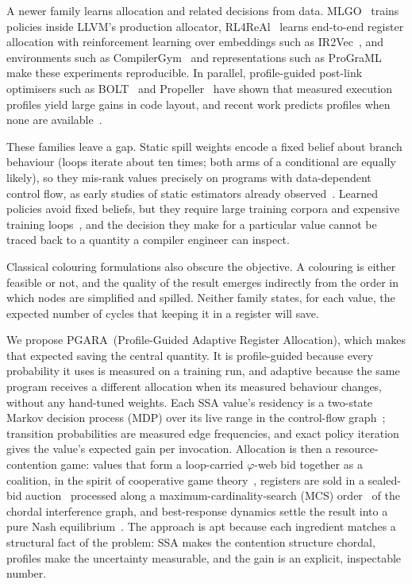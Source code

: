 \documentclass[conference]{IEEEtran}
\newcommand{\MG}{PGARA}
\begin{document}
A newer family learns allocation and related decisions from data.
MLGO~\cite{trofin2021mlgo} trains policies inside LLVM's production
allocator, RL4ReAl~\cite{venkatakeerthy2023rl4real} learns end-to-end
register allocation with reinforcement learning over embeddings such as
IR2Vec~\cite{venkatakeerthy2020ir2vec}, and environments such as
CompilerGym~\cite{cummins2022compilergym} and representations such as
ProGraML~\cite{cummins2021programl} make these experiments
reproducible. In parallel, profile-guided post-link optimisers such as
BOLT~\cite{panchenko2019bolt} and Propeller~\cite{shen2023propeller}
have shown that measured execution profiles yield large gains in code
layout, and recent work predicts profiles when none are
available~\cite{rotem2021pgo}.

These families leave a gap. Static spill weights encode a fixed belief
about branch behaviour (loops iterate about ten times; both arms of a
conditional are equally likely), so they mis-rank values precisely on
programs with data-dependent control flow, as early studies of static
estimators already observed~\cite{wagner1994,wu1994}. Learned policies
avoid fixed beliefs, but they require large training corpora and
expensive training loops~\cite{sutton2018rl}, and the decision they make
for a particular value cannot be traced back to a quantity a compiler
engineer can inspect.

Classical colouring formulations also obscure the objective. A
colouring is either feasible or not, and the quality of the result
emerges indirectly from the order in which nodes are simplified and
spilled. Neither family states, for each value, the expected number of
cycles that keeping it in a register will save.

We propose \MG\ (Profile-Guided Adaptive Register Allocation), which
makes that expected saving the central quantity. It is profile-guided
because every probability it uses is measured on a training run, and
adaptive because the same program receives a different allocation when
its measured behaviour changes, without any hand-tuned weights.
Each SSA value's residency is a two-state Markov decision process (MDP)
over its live range in the control-flow graph~\cite{puterman1994,bertsekas2019};
transition probabilities are measured edge frequencies, and exact policy
iteration~\cite{howard1960} gives the value's expected gain per
invocation. Allocation is then a resource-contention game: values that
form a loop-carried $\varphi$-web bid together as a coalition, in the
spirit of cooperative game theory~\cite{shapley1953}, registers are sold
in a sealed-bid auction~\cite{vickrey1961} processed along a
maximum-cardinality-search (MCS) order~\cite{tarjan1984} of the chordal
interference graph, and best-response dynamics settle the result into a
pure Nash equilibrium~\cite{rosenthal1973,nisan2007agt}. The approach
is apt because each ingredient matches a structural fact of the problem:
SSA makes the contention structure chordal, profiles make the
uncertainty measurable, and the gain is an explicit, inspectable number.
\end{document}
